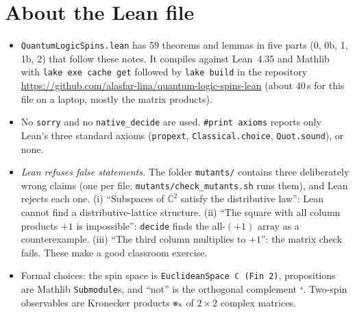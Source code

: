 \documentclass[11pt,a4paper]{article}
\theoremstyle{plain}
\theoremstyle{definition}
\theoremstyle{remark}
\newcommand{\C}{\mathbb{C}}
\begin{document}
\section{About the Lean file}
\begin{itemize}
\item \texttt{QuantumLogicSpins.lean} has 59 theorems and lemmas in five parts (0, 0b, 1, 1b, 2) that follow these notes. It compiles against Lean~4.35 and Mathlib with \texttt{lake exe cache get} followed by \texttt{lake build} in the repository \url{https://github.com/alasfar-lina/quantum-logic-spins-lean} (about 40\,s for this file on a laptop, mostly the matrix products).
\item No \texttt{sorry} and no \texttt{native\_decide} are used. \texttt{\#print axioms} reports only Lean's three standard axioms (\texttt{propext}, \texttt{Classical.choice}, \texttt{Quot.sound}), or none.
\item \emph{Lean refuses false statements.} The folder \texttt{mutants/} contains three deliberately wrong claims (one per file; \texttt{mutants/check\_mutants.sh} runs them), and Lean rejects each one. (i) ``Subspaces of $\C^2$ satisfy the distributive law'': Lean cannot find a distributive-lattice structure. (ii) ``The square with all column products $+1$ is impossible'': \texttt{decide} finds the all-$(+1)$ array as a counterexample. (iii) ``The third column multiplies to $+1$'': the matrix check fails. These make a good classroom exercise.
\item Formal choices: the spin space is \texttt{EuclideanSpace ℂ (Fin 2)}, propositions are Mathlib \texttt{Submodule}s, and ``not'' is the orthogonal complement \texttt{ᗮ}. Two-spin observables are Kronecker products \texttt{⊗ₖ} of $2\times2$ complex matrices.
\end{itemize}
\end{document}
